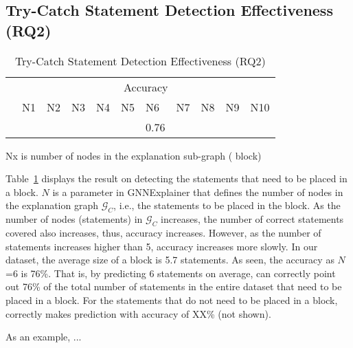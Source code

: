 \subsection{Try-Catch Statement Detection Effectiveness (RQ2)}
\label{sec:rq2}

\begin{table}[t]
  \caption{Try-Catch Statement Detection Effectiveness (RQ2)}
  \vspace{-12pt}
	\begin{center}
		\small
		\renewcommand{\arraystretch}{1} 
		\begin{tabular}{p{0.8cm}<{\centering}|p{0.4cm}<{\centering}|p{0.4cm}<{\centering}|p{0.4cm}<{\centering}|p{0.4cm}<{\centering}|p{0.4cm}<{\centering}|p{0.4cm}<{\centering}|p{0.4cm}<{\centering}|p{0.4cm}<{\centering}|p{0.4cm}<{\centering}|p{0.4cm}<{\centering}}
			\hline
			 	&  \multicolumn{10}{c}{Accuracy} \\
			\cline{2-11}
			     	&  N1  & N2   &  N3  & N4   &N5    & N6   &N7    & N8   &N9    & N10 \\
			\hline
			\tool       &  &  &  &  &  & 0.76 &  &  &  &   \\
			\hline
		\end{tabular}
		Nx is number of nodes in the explanation
                sub-graph ( block)
		\label{tab:rq2}
	\end{center}
\end{table}

Table~\ref{tab:rq2} displays the result on detecting the statements
that need to be placed in a  block. $N$ is a parameter
in GNNExplainer that defines the number of nodes in the explanation
graph $\mathcal{G}_C$, i.e., the statements to be placed in the
 block.
%
As the number of nodes (statements) in $\mathcal{G}_C$ increases, the
number of correct statements covered also increases, thus, accuracy
increases. However, as the number of statements increases higher than
5, accuracy increases more slowly. In our dataset, the average size of
a  block is 5.7 statements. As seen, the accuracy as
$N$=6 is 76\%. That is, by predicting 6 statements on average, {\tool}
can correctly point out 76\% of the total number of statements in the
entire dataset that need to be placed in a  block.
For the statements that do not need to be placed in a 
block, {\tool} correctly makes prediction with accuracy of XX\% (not
shown).

As an example, ...

